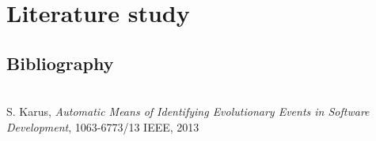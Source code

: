 \section{Literature study}

\subsection{Bibliography}
\begingroup
\renewcommand{\section}[2]{}%
\begin{thebibliography}{99}
	 \hfill \\ S. Karus, \emph{Automatic Means of
	Identifying Evolutionary Events in Software Development}, 1063-6773/13 IEEE,
	2013
\end{thebibliography}
\endgroup
